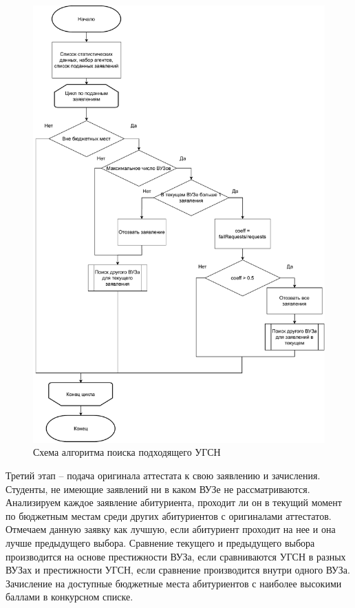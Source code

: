 \begin{figure}[hbtp]
	\centering
	\includegraphics[scale=0.6]{idef0/find.pdf}
	\caption{Схема алгоритма поиска подходящего УГСН}
	\label{scheme:find}
\end{figure}


Третий этап – подача оригинала аттестата к свою заявлению и зачисления. Студенты, не имеющие заявлений ни в каком ВУЗе не рассматриваются. Анализируем каждое заявление абитуриента, проходит ли он в текущий момент по бюджетным местам среди других абитуриентов с оригиналами аттестатов. Отмечаем данную заявку как лучшую, если абитуриент проходит на нее и она лучше предыдущего выбора. Сравнение текущего и предыдущего выбора производится на основе престижности ВУЗа, если сравниваются УГСН в разных ВУЗах и престижности УГСН, если сравнение производится внутри одного ВУЗа. Зачисление на доступные бюджетные места абитуриентов с наиболее высокими баллами в конкурсном списке.

